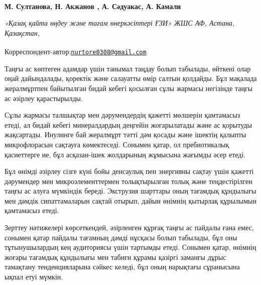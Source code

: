 
\begin{articleheader}

{\bfseries
М. Султанова,
Н. Акжанов\textsuperscript{\envelope } ,
А. Сәдуакас,
А. Камали}
\end{articleheader}

\begin{affiliation}
\emph{«Қазақ қайта өңдеу және тағам өнеркәсіптері ҒЗИ» ЖШС АФ, Астана, Қазақстан,}

\raggedright \textsuperscript{\envelope }Корреспондент-автор:\href{mailto:nurtore0308@gmail.com}{\nolinkurl{nurtore0308@gmail.com}}
\end{affiliation}

Таңғы ас көптеген адамдар үшін танымал таңдау болып табылады, өйткені
олар оңай дайындалады, қоректік және салауатты өмір салтын қолдайды. Бұл
мақалада жералмұртпен байытылған бидай кебегі қосылған сұлы жармасы
негізінде таңғы ас әзірлеу қарастырылды.

Сұлы жармасы талшықтар мен дәрумендердің қажетті мөлшерін қамтамасыз
етеді, ал бидай кебегі минералдардың деңгейін жоғарылатады және ас
қорытуды жақсартады. Инулинге бай жералмұрт тәтті дәм қосады және
ішектің қалыпты микрофлорасын сақтауға көмектеседі. Сонымен қатар, ол
пребиотикалық қасиеттерге ие, бұл асқазан-ішек жолдарының жұмысына
жағымды әсер етеді.

Бұл өнімді әзірлеу сізге күні бойы денсаулық пен энергияны сақтау үшін
қажетті дәрумендер мен микроэлементтермен толықтырылған толық және
теңдестірілген таңғы ас алуға мүмкіндік береді. Экструзия шарттары оның
тағамдық құндылығы мен дәмдік сипаттамаларын сақтай отырып, дайын
өнімнің қытырлақ құрылымын қамтамасыз етеді.

Зерттеу нәтижелері көрсеткендей, әзірленген құрғақ таңғы ас пайдалы ғана
емес, сонымен қатар пайдалы тағамның дәмді нұсқасы болып табылады, бұл
оны тұтынушылардың кең аудиториясы үшін тартымды етеді. Сонымен қатар,
өнімнің жоғары тағамдық құндылығы мен табиғи құрамы қазіргі заманғы
дұрыс тамақтану тенденцияларына сәйкес келеді, бұл оның нарықтағы
сұранысына ықпал етуі мүмкін.

